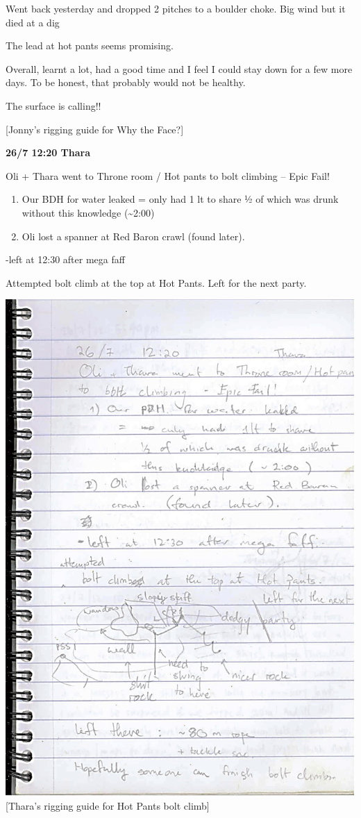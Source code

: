 Went back yesterday and dropped 2 pitches to a boulder choke. Big wind
but it died at a dig

The lead at hot pants seems promising.

Overall, learnt a lot, had a good time and I feel I could stay down for
a few more days. To be honest, that probably would not be healthy.

The surface is calling!!

{[}Jonny's rigging guide for Why the Face?{]}

\textbf{26/7 12:20 Thara}

Oli + Thara went to Throne room / Hot pants to bolt climbing -- Epic
Fail!

\begin{enumerate}
\def\labelenumi{\arabic{enumi}.}
\tightlist
\item
  Our BDH for water leaked = only had 1 lt to share ½ of which was drunk
  without this knowledge (\textasciitilde 2:00)
\item
  Oli lost a spanner at Red Baron crawl (found later).
\end{enumerate}

-left at 12:30 after mega faff

Attempted bolt climb at the top at Hot Pants. Left for the next party.

\includegraphics{UgLog1012/76.jpeg}\\
{[}Thara's rigging guide for Hot Pants bolt climb{]}

